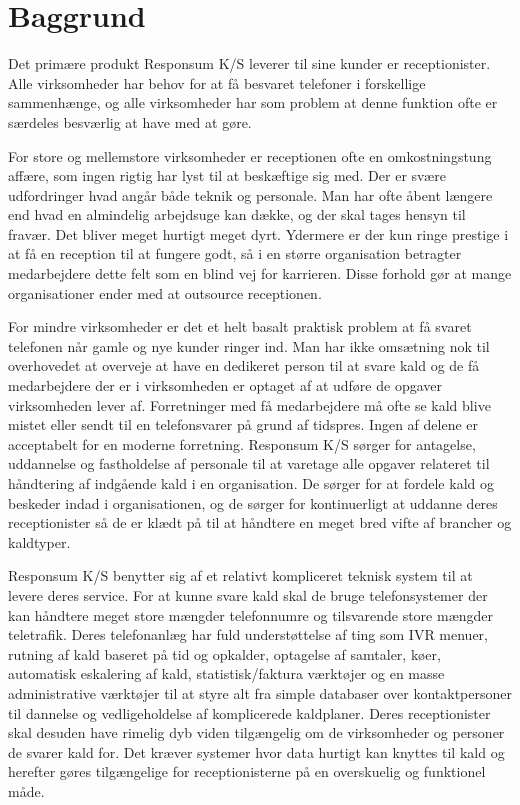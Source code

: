 \chapter{Baggrund}

Det primære produkt Responsum K/S leverer til sine kunder er receptionister. Alle virksomheder har behov for at få  besvaret telefoner i forskellige sammenhænge, og alle virksomheder har som problem at denne funktion ofte er særdeles besværlig at have med at gøre. 

For store og mellemstore virksomheder er receptionen ofte en omkostningstung affære, som ingen rigtig har lyst til at beskæftige sig med. Der er svære udfordringer hvad angår både teknik og personale. Man har ofte åbent længere end hvad en almindelig arbejdsuge kan dække, og der skal tages hensyn til fravær. Det bliver meget hurtigt meget dyrt. Ydermere er der kun ringe prestige i at få en reception til at fungere godt, så i en større organisation betragter medarbejdere dette felt som en blind vej for karrieren. Disse forhold gør at mange organisationer ender med at outsource receptionen.

For mindre virksomheder er det et helt basalt praktisk problem at få svaret telefonen når gamle og nye kunder ringer ind. Man har ikke omsætning nok til overhovedet at overveje at have en dedikeret person til at svare kald og de få medarbejdere der er i virksomheden er optaget af at udføre de opgaver virksomheden lever af. Forretninger med få medarbejdere må ofte se kald blive mistet eller sendt til en telefonsvarer på grund af tidspres. Ingen af delene er acceptabelt for en moderne forretning.
Responsum K/S sørger for antagelse, uddannelse og fastholdelse af personale til at varetage alle opgaver relateret til håndtering af indgående kald i en organisation. De sørger for at fordele kald og beskeder indad i organisationen, og de sørger for kontinuerligt at uddanne deres receptionister så de er klædt på til at håndtere en meget bred vifte af brancher og kaldtyper.

Responsum K/S benytter sig af et relativt kompliceret teknisk system til at levere deres service. For at kunne svare kald skal de bruge telefonsystemer der kan håndtere meget store mængder telefonnumre og tilsvarende store mængder teletrafik. Deres telefonanlæg har fuld understøttelse af ting som IVR menuer, rutning af kald baseret på tid og opkalder, optagelse af samtaler, køer, automatisk eskalering af kald, statistisk/faktura værktøjer og en masse administrative værktøjer til at styre alt fra simple databaser over kontaktpersoner til dannelse og vedligeholdelse af komplicerede kaldplaner. Deres receptionister skal desuden have rimelig dyb viden tilgængelig om de virksomheder og personer de svarer kald for. Det kræver systemer hvor data hurtigt kan knyttes til kald og herefter gøres tilgængelige for receptionisterne på en overskuelig og funktionel måde.

